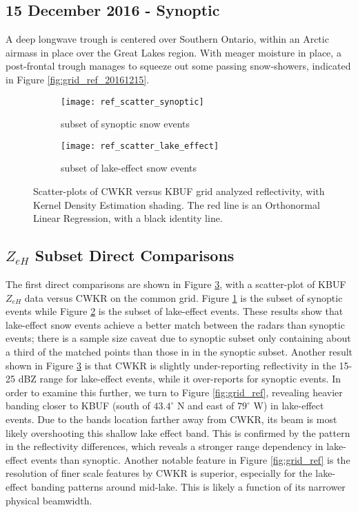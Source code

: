 \subsection{15 December 2016 - Synoptic}
A deep longwave trough is centered over Southern Ontario, within an Arctic airmass in place over the Great Lakes region. With meager moisture in place, a post-frontal trough manages to squeeze out some passing snow-showers, indicated in Figure \ref{fig:grid_ref_20161215}.


\begin{figure}[h]
\centering
   \begin{subfigure}{0.49\linewidth} \centering
     \texttt{[image: ref\_scatter\_synoptic]}
     \caption{subset of synoptic snow events}\label{fig:ref_synoptic}
   \end{subfigure}
   \begin{subfigure}{0.49\linewidth} \centering
     \texttt{[image: ref\_scatter\_lake\_effect]}
     \caption{subset of lake-effect snow events}\label{fig:ref_lake_effect}
   \end{subfigure}
\caption{Scatter-plots of CWKR versus KBUF grid analyzed reflectivity, with Kernel Density Estimation shading. The red line is an Orthonormal Linear Regression, with a black identity line.} \label{fig:ref_scatter}
\end{figure}

\subsection{$Z_{eH}$ Subset Direct Comparisons}
The first direct comparisons are shown in Figure \ref{fig:ref_scatter}, with a scatter-plot of KBUF $Z_{eH}$ data versus CWKR on the common grid. Figure \ref{fig:ref_synoptic} is the subset of synoptic events while Figure \ref{fig:ref_lake_effect} is the subset of lake-effect events. These results show that lake-effect snow events achieve a better match between the radars than synoptic events; there is a sample size caveat due to synoptic subset only containing about a third of the matched points than those in in the synoptic subset. Another result shown in Figure \ref{fig:ref_scatter} is that CWKR is slightly under-reporting reflectivity in the 15-25 dBZ range for lake-effect events, while it over-reports for synoptic events. In order to examine this further, we turn to Figure \ref{fig:grid_ref}, revealing heavier banding closer to KBUF (south of $43.4^{\circ}$ N and east of $79^{\circ}$ W) in lake-effect events. Due to the bands location farther away from CWKR, its beam is most likely overshooting this shallow lake effect band. This is confirmed by the pattern in the reflectivity differences, which reveals a stronger range dependency in lake-effect events than synoptic. Another notable feature in Figure \ref{fig:grid_ref} is the resolution of finer scale features by CWKR is superior, especially for the lake-effect banding patterns around mid-lake. This is likely a function of its narrower physical beamwidth.


